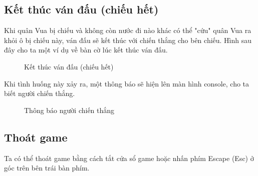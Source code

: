\subsection{Kết thúc ván đấu (chiếu hết)}
Khi quân Vua bị chiếu và không còn nước đi nào khác có thể "cứu" quân Vua ra khỏi ô bị chiếu này, ván đấu sẽ kết thúc với chiến thắng cho bên chiếu. Hình sau đây cho ta một ví dụ về bàn cờ lúc kết thúc ván đấu.
\begin{figure}[H]
\caption{Kết thúc ván đấu (chiếu hết)}
\end{figure}
Khi tình huống này xảy ra, một thông báo sẽ hiện lên màn hình console, cho ta biết người chiến thắng.
\begin{figure}[H]
\caption{Thông báo người chiến thắng}
\end{figure}

\subsection{Thoát game}
Ta có thể thoát game bằng cách tắt cửa sổ game hoặc nhấn phím Escape (Esc) ở góc trên bên trái bàn phím.
